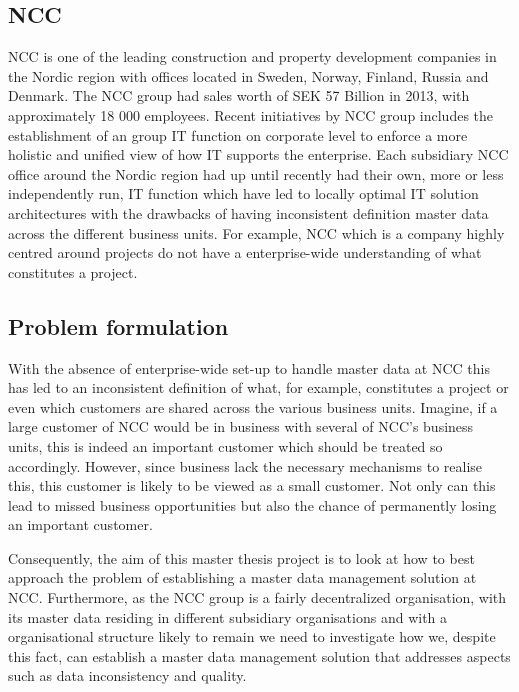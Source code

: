 \documentclass[12pt]{article}
\begin{document}
\subsection{NCC}
\label{ch:NCC}

NCC is one of the leading construction and property development companies in the Nordic region with offices located in Sweden, Norway, Finland, Russia and Denmark. The NCC group had sales worth of SEK 57 Billion in 2013, with approximately 18 000 employees. Recent initiatives by NCC group includes the establishment of an group IT function on corporate level to enforce a more holistic and unified view of how IT supports the enterprise. Each subsidiary NCC office around the Nordic region had up until recently had their own, more or less independently run, IT function which have led to locally optimal IT solution architectures with the drawbacks of having inconsistent definition master data across the different business units. For example, NCC which is a company highly centred around projects do not have a enterprise-wide understanding of what constitutes a project. 

\subsection{Problem formulation}
\label{ch:problemformulation}

With the absence of enterprise-wide set-up to handle master data at NCC this has led to an inconsistent definition of what, for example, constitutes a project or even which customers are shared across the various business units. Imagine, if a large customer of NCC would be in business with several of NCC’s business units, this is indeed an important customer which should be treated so accordingly. However, since business lack the necessary mechanisms to realise this, this customer is likely to be viewed as a small customer. Not only can this lead to missed business opportunities but also the chance of permanently losing an important customer. 

Consequently, the aim of this master thesis project is to look at how to best approach the problem of establishing a master data management solution at NCC. Furthermore, as the NCC group is a fairly decentralized organisation, with its master data residing in different subsidiary organisations and with a organisational structure likely to remain we need to investigate how we, despite this fact, can establish a master data management solution that addresses aspects such as data inconsistency and quality. 
\end{document}
